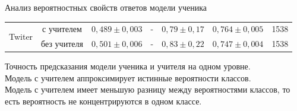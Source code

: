 \documentclass[10pt,pdf,hyperref={unicode}]{beamer}
\begin{document}
\begin{frame}{Анализ вероятностных свойств ответов модели ученика}
\begin{table}[]
\begin{center}
{\begin{tabular}{|l|c|c|c|c|c|c|}
\multirow{2}{*}{Twiter}       & с учителем  & $0{,}489\pm0{,}003$                                               & -                                                                                             & $0{,}79\pm0{,}17$                                               & $0{,}764\pm0{,}005$ & 1538                                                       \\ \cline{2-7} 
                              & без учителя &  $0{,}501\pm0{,}006$                                                & -                                                                                             & $0{,}83\pm0{,}22$                                               & $0{,}747\pm0{,}004$ & 1538                                                       \\ \hline 
\end{tabular}
}
\end{center}
\end{table}

Точность предсказания модели ученика и учителя на одном уровне.\\
{\color{blue}Модель с учителем аппроксимирует истинные вероятности классов.}\\
{\color{red}Модель с учителем имеет меньшую разницу между вероятностями классов, то есть вероятность не концентрируются в одном классе.}
\end{frame}
\end{document}
